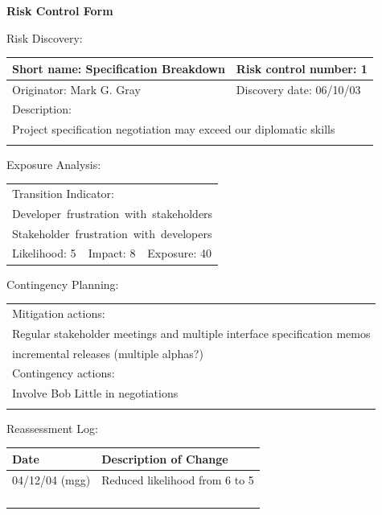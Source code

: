 \documentclass{article}
\begin{document}
\begin{center}\Large\bf
Risk Control Form
\end{center}
\vspace{24pt}

Risk Discovery:

\begin{tabular}{|p{211pt}|p{211pt}|} \hline
Short name: Specification Breakdown & Risk control number: 1\\ \hline
Originator: Mark G. Gray & Discovery date: 06/10/03 \\ \hline
\multicolumn{2}{|l|}{Description:} \\
\multicolumn{2}{|l|}{Project specification negotiation may exceed our 
diplomatic skills} \\
\multicolumn{2}{|l|}{\mbox{}} \\ \hline
\end{tabular}
\vspace{24pt}

Exposure Analysis:

\begin{tabular}{|p{138pt}|p{138pt}|p{138pt}|} \hline
\multicolumn{3}{|l|}{Transition Indicator:} \\
\multicolumn{3}{|l|}{\mbox{Developer frustration with stakeholders}} \\
\multicolumn{3}{|l|}{\mbox{Stakeholder frustration with developers}} \\ \hline
Likelihood: 5 & Impact: 8 & Exposure: 40 \\ \hline
\end{tabular}
\vspace{24pt}

Contingency Planning:

\begin{tabular}{|p{433pt}|} \hline
Mitigation actions: \\
Regular stakeholder meetings and multiple interface specification memos  \\
incremental releases (multiple alphas?) \\ \hline
Contingency actions: \\
Involve Bob Little in negotiations \\
\mbox{} \\ \hline
\end{tabular}
\vspace{24pt}

Reassessment Log:

\begin{tabular}{|p{72pt}|p{351pt}|} \hline
Date & Description of Change \\ \hline
04/12/04 (mgg) & Reduced likelihood from 6 to 5 \\ \hline
\mbox{} & \mbox{} \\ \hline
\mbox{} & \mbox{} \\ \hline
\mbox{} & \mbox{} \\ \hline
\mbox{} & \mbox{} \\ \hline
\end{tabular}
\vspace{24pt}
\end{document}
